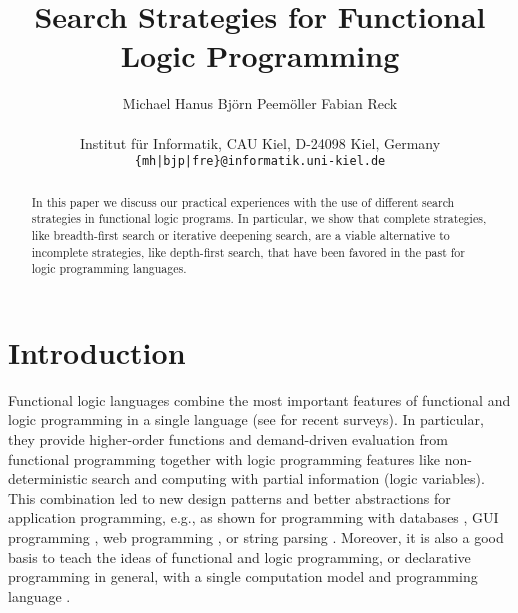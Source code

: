 \documentclass[english]{lni}
\author{
Michael Hanus
\quad
Bj{\"o}rn Peem{\"o}ller
\quad
Fabian Reck \\
\\
Institut f\"ur Informatik, CAU Kiel, D-24098 Kiel, Germany \\
\texttt{\{mh|bjp|fre\}@informatik.uni-kiel.de}
}
\title{Search Strategies for Functional Logic Programming}
\begin{document}
\maketitle

\begin{abstract}
In this paper we discuss our practical experiences
with the use of different search strategies
in functional logic programs.
In particular, we show that complete strategies,
like breadth-first search or iterative deepening search,
are a viable alternative to incomplete strategies, like depth-first
search, that have been favored in the past for logic programming languages.
\end{abstract}

\section{Introduction}

Functional logic languages combine the most important
features of functional and logic programming in a single language
(see \cite{AntoyHanus10CACM,Hanus07ICLP} for recent surveys).
In particular, they provide higher-order functions and demand-driven
evaluation from functional programming together with logic programming features
like non-deterministic search and computing with partial information
(logic variables).
This combination
led to new design patterns \cite{AntoyHanus02FLOPS,AntoyHanus11WFLP}
and better abstractions for application programming,
e.g., as shown for programming with databases
\cite{BrasselHanusMueller08PADL,Fischer05},
GUI programming \cite{Hanus00PADL},
web programming \cite{Hanus01PADL,Hanus06PPDP,HanusKoschnicke10PADL},
or string parsing \cite{CaballeroLopez99}.
Moreover, it is also a good basis
to teach the ideas of functional and logic programming,
or declarative programming in general,
with a single computation model and programming language
\cite{Hanus97DPLE}.
\end{document}
